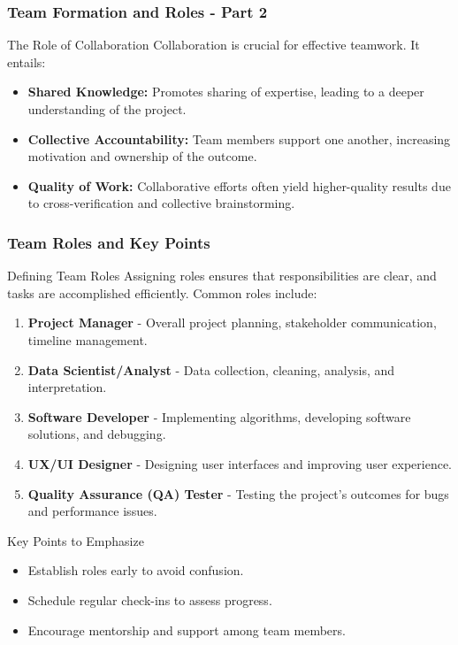 \documentclass[aspectratio=169]{beamer}
\begin{document}
\begin{frame}[fragile]
    \frametitle{Team Formation and Roles - Part 2}
    
    \begin{block}{The Role of Collaboration}
        Collaboration is crucial for effective teamwork. It entails:
    \end{block}
    
    \begin{itemize}
        \item \textbf{Shared Knowledge:} Promotes sharing of expertise, leading to a deeper understanding of the project.
        \item \textbf{Collective Accountability:} Team members support one another, increasing motivation and ownership of the outcome.
        \item \textbf{Quality of Work:} Collaborative efforts often yield higher-quality results due to cross-verification and collective brainstorming.
    \end{itemize}
\end{frame}

\begin{frame}[fragile]
    \frametitle{Team Roles and Key Points}
    
    \begin{block}{Defining Team Roles}
        Assigning roles ensures that responsibilities are clear, and tasks are accomplished efficiently. Common roles include:
    \end{block}
    
    \begin{enumerate}
        \item \textbf{Project Manager} - Overall project planning, stakeholder communication, timeline management.
        \item \textbf{Data Scientist/Analyst} - Data collection, cleaning, analysis, and interpretation.
        \item \textbf{Software Developer} - Implementing algorithms, developing software solutions, and debugging.
        \item \textbf{UX/UI Designer} - Designing user interfaces and improving user experience.
        \item \textbf{Quality Assurance (QA) Tester} - Testing the project's outcomes for bugs and performance issues.
    \end{enumerate}
    
    \begin{block}{Key Points to Emphasize}
        \begin{itemize}
            \item Establish roles early to avoid confusion.
            \item Schedule regular check-ins to assess progress.
            \item Encourage mentorship and support among team members.
        \end{itemize}
    \end{block}
\end{frame}
\end{document}
